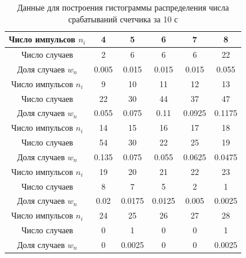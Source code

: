 \documentclass[a4paper,12pt]{article}
\begin{document}
\begin{table}[H]
\centering
\caption{Данные для построения гистограммы распределения числа срабатываний счетчика за 10 с} \label{10c}
\begin{tabular}{|c|c|c|c|c|c|}
\hline
Число импульсов $n_i$ & 4 & 5 & 6 & 7 & 8 \\
\hline
Число случаев & 2 & 6 & 6 & 6 & 22 \\
\hline
Доля случаев $w_n$ & 0.005 & 0.015 & 0.015 & 0.015 & 0.055 \\
\hline
\hline
Число импульсов $n_i$ & 9 & 10 & 11 & 12 & 13 \\
\hline
Число случаев & 22 & 30 & 44 & 37 & 47 \\
\hline
Доля случаев $w_n$ & 0.055 & 0.075 & 0.11 & 0.0925 & 0.1175 \\
\hline
\hline
Число импульсов $n_i$ & 14 & 15 & 16 & 17 & 18 \\
\hline
Число случаев & 54 & 30 & 22 & 25 & 19 \\
\hline
Доля случаев $w_n$ & 0.135 & 0.075 & 0.055 & 0.0625 & 0.0475 \\
\hline
\hline
Число импульсов $n_i$ & 19 & 20 & 21 & 22 & 23 \\
\hline
Число случаев & 8 & 7 & 5 & 2 & 1 \\
\hline
Доля случаев $w_n$ & 0.02 & 0.0175 & 0.0125 & 0.005 & 0.0025 \\
\hline
\hline
Число импульсов $n_i$ & 24 & 25 & 26 & 27 & 28\\
\hline
Число случаев & 0 & 1 & 0 & 0 & 1\\
\hline
Доля случаев $w_n$ & 0 & 0.0025 & 0 & 0 & 0.0025\\
\hline

\end{tabular}
\end{table}
\end{document}
